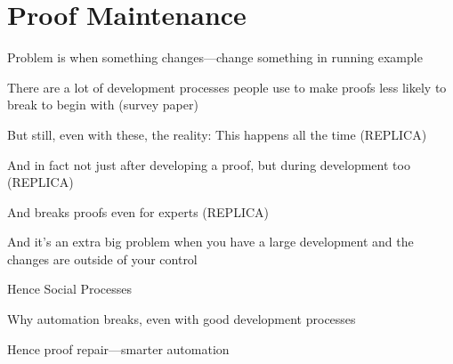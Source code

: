 \section{Proof Maintenance}

Problem is when something changes---change something in running example

There are a lot of development processes people use to make proofs less likely to break to begin with (survey paper)

But still, even with these, the reality: This happens all the time (REPLICA)

And in fact not just after developing a proof, but during development too (REPLICA)

And breaks proofs even for experts (REPLICA)

And it's an extra big problem when you have a large development and the changes are outside of your control

Hence Social Processes

Why automation breaks, even with good development processes

Hence proof repair---smarter automation


%

%

%

%

%

